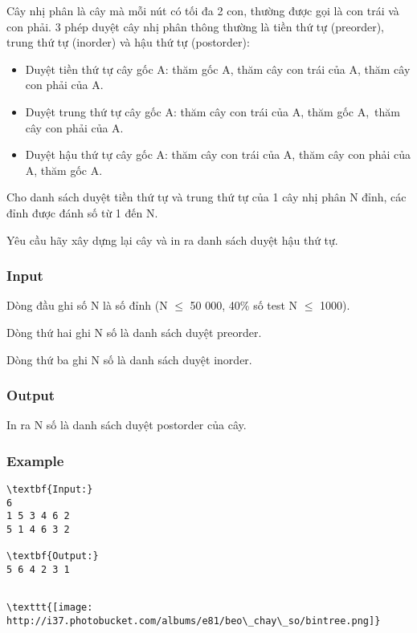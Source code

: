 

Cây nhị phân là cây mà mỗi nút có tối đa 2 con, thường được gọi là con trái và con phải. 3 phép duyệt cây nhị phân thông thường là tiền thứ tự (preorder), trung thứ tự (inorder) và hậu thứ tự (postorder):
\begin{itemize}
	\item Duyệt tiền thứ tự cây gốc A: thăm gốc A, thăm cây con trái của A, thăm cây con phải của A.
	\item Duyệt trung thứ tự cây gốc A: thăm cây con trái của A, thăm gốc A, thăm cây con phải của A.
	\item Duyệt hậu thứ tự cây gốc A: thăm cây con trái của A, thăm cây con phải của A, thăm gốc A.
\end{itemize}

Cho danh sách duyệt tiền thứ tự và trung thứ tự của 1 cây nhị phân N đỉnh, các đỉnh được đánh số từ 1 đến N.

Yêu cầu hãy xây dựng lại cây và in ra danh sách duyệt hậu thứ tự.

\subsubsection{Input \href{http://vi.wikipedia.org/wiki/Duy%E1%BB%87t_c%C3%A2y}{}}

Dòng đầu ghi số N là số đỉnh (N  $\le$  50 000, 40\% số test N  $\le$  1000).

Dòng thứ hai ghi N số là danh sách duyệt preorder.

Dòng thứ ba ghi N số là danh sách duyệt inorder.

\subsubsection{Output}

In ra N số là danh sách duyệt postorder của cây.

\subsubsection{Example}
\begin{verbatim}
\textbf{Input:}
6
1 5 3 4 6 2
5 1 4 6 3 2

\textbf{Output:}
5 6 4 2 3 1\end{verbatim}
\begin{verbatim}

\texttt{[image: http://i37.photobucket.com/albums/e81/beo\_chay\_so/bintree.png]}\end{verbatim}
